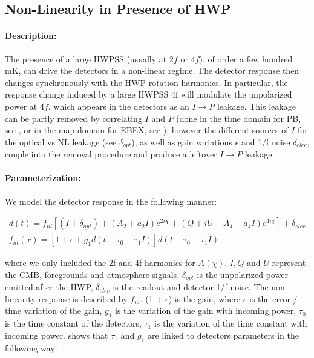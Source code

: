 \subsection{Non-Linearity in Presence of HWP}

\paragraph{Description:} 

The presence of a large HWPSS (usually at 2$f$ or 4$f$), of order a few hundred mK, can drive the detectors in a non-linear regime. The detector response then changes synchronously with the HWP rotation harmonics. In particular, the response change induced by a large HWPSS 4f will modulate the unpolarized power at 4$f$, which appears in the detectors as an $I \rightarrow P$ leakage. This leakage can be partly removed by correlating $I$ and $P$ (done in the time domain for PB, see \cite{PB1_WHWP}, or in the map domain for EBEX, see \cite{joy_thesis_2016}), however the different sources of $I$ for the optical vs NL leakage (see $\delta_{opt}$), as well as gain variations $\epsilon$ and 1/f noise $\delta_{elec}$, couple into the removal procedure and produce a leftover $I \rightarrow P$ leakage.

\paragraph{Parameterization:}
We model the detector response in the following manner:

\begin{align}
d(t) = f_{nl} \left[  (I+\delta_{opt}) + (A_2 + a_2 I) e^{2 i \chi} + (Q + iU + A_4 + a_4 I)  e^{4 i \chi} \right] + \delta_{elec} \\
f_{nl}(x) = \left[ 1 + \epsilon + g_1 d(t - \tau_0 - \tau_1 I) \right] d(t - \tau_0 - \tau_1 I)
\end{align}

\noindent where we only included the 2f and 4f harmonics for $A(\chi)$. $I, Q$ and $U$ represent the CMB, foregrounds and atmosphere signals. $\delta_{opt}$ is the unpolarized power emitted after the HWP, $\delta_{elec}$ is the readout and detector 1/f noise. The non-linearity response is described by $f_{nl}$. (1 + $\epsilon$) is the gain, where $\epsilon$ is the error / time variation of the gain, $g_1$ is the variation of the gain with incoming power, $\tau_0$ is the time constant of the detectors, $\tau_1$ is the variation of the time constant with incoming power. \cite{PB1_WHWP} shows that $\tau_1$ and $g_1$ are linked to detectors parameters in the following way:

